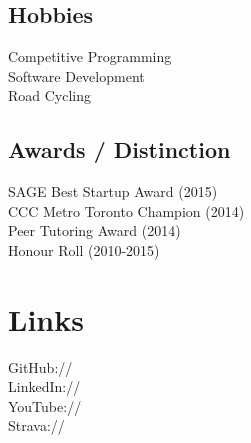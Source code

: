 \documentclass[]{deedy-resume-openfont}
\begin{document}
\begin{minipage}[t]{0.33\textwidth}
\subsection{Hobbies}
\textbullet{} Competitive Programming\\
\textbullet{} Software Development\\
\textbullet{} Road Cycling\\

\vspace{2mm}

\subsection{Awards / Distinction}
\textbullet{} SAGE Best Startup Award (2015) \\
\textbullet{} CCC Metro Toronto Champion (2014) \\
\textbullet{} Peer Tutoring Award (2014)\\
\textbullet{} Honour Roll (2010-2015) \\

\vspace{1mm}


\section{Links} 
GitHub:// \href{https://github.com/MathBunny}{} \\
LinkedIn://  \href{https://www.linkedin.com/in/horatiulazu}{} \\
YouTube://  \href{https://www.youtube.com/user/SoftwareEngenius}{} \\
Strava://  \href{https://www.strava.com/athletes/6214103}{} \\
\sectionsep

%
%

\end{minipage} 
\hfill
\end{document}
